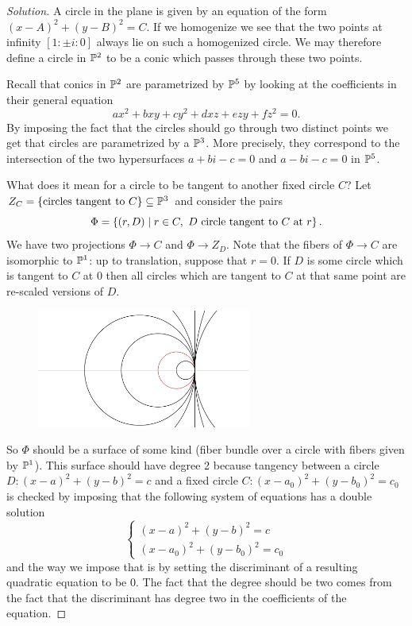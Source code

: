 \begin{proof}[Solution]
A circle in the plane is given by an equation of the form $(x-A)^2+(y-B)^2=C$. If we homogenize we see that the two points at infinity $[1:\pm i:0]$ always lie on such a homogenized circle. We may therefore define a circle in $\mathbb{P}^2$ to be a conic which passes through these two points.

Recall that conics in $\mathbb{P}^2$ are parametrized by $\mathbb{P}^5$ by looking at the coefficients in their general equation
\[ax^2+bxy+cy^2+dxz+ezy+fz^2=0.\]
By imposing the fact that the circles should go through two distinct points we get that circles are parametrized by a $\mathbb{P}^3$. More precisely, they correspond to the intersection of the two hypersurfaces $a+bi-c=0$ and $a-bi-c=0$ in $\mathbb{P}^5$.


What does it mean for a circle to be tangent to another fixed circle $C$? Let $Z_C=\left\{{\text{circles tangent to $C$}}\right\}\subseteq\mathbb{P}^3$ and consider the pairs
\[\Phi=\left\{{(r,D)\mid r\in C,\ D \text{ circle tangent to $C$ at $r$}}\right\}.\]
We have two projections $\Phi\to C$ and $\Phi\to Z_D$. Note that the fibers of $\Phi\to C$ are isomorphic to $\mathbb{P}^1$: up to translation, suppose that $r=0$. If $D$ is some circle which is tangent to $C$ at $0$ then all circles which are tangent to $C$ at that same point are re-scaled versions of $D$. 

\begin{figure}[!htb]
	\centering
	\includegraphics[width=7cm]{Images/pencil-of-tangent-circles.png}
\end{figure}

So $\Phi$ should be a surface of some kind (fiber bundle over a circle with fibers given by $\mathbb{P}^1$). This surface should have degree 2 because tangency between a circle $D:(x-a)^2+(y-b)^2=c$ and a fixed circle $C:(x-a_0)^2+(y-b_0)^2=c_0$ is checked by imposing that the following system of equations has a double solution 
\[\begin{cases}
	(x-a)^2+(y-b)^2=c\\
	(x-a_0)^2+(y-b_0)^2=c_0
\end{cases}\]
and the way we impose that is by setting the discriminant of a resulting quadratic equation to be 0. The fact that the degree should be two comes from the fact that the discriminant has degree two in the coefficients of the equation.


\end{proof}
